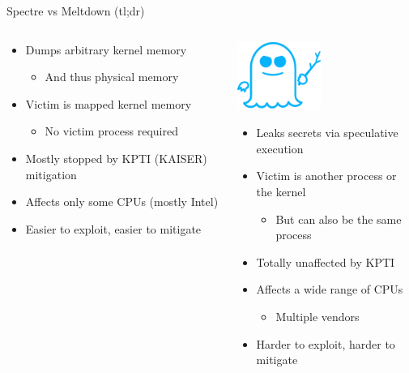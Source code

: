 \documentclass[10pt, dvipsnames, aspectratio=169]{beamer}
\begin{document}
\begingroup
\setwatermark{}
\begin{frame}[c]{Spectre vs Meltdown (tl;dr)}
  \begin{columns}
    \begin{column}[t]{0.5\textwidth}
      \centering
      
      \begin{itemize}
        \item Dumps arbitrary kernel memory
        \begin{itemize}
          \item And thus physical memory
        \end{itemize}
        \item Victim is mapped kernel memory
        \begin{itemize}
          \item No victim process required
        \end{itemize}
        \item Mostly stopped by KPTI (KAISER) mitigation
        \item Affects only some CPUs (mostly Intel)
        \item Easier to exploit, easier to mitigate
      \end{itemize}
    \end{column}

    \begin{column}[t]{0.5\textwidth}
      \centering
      \includegraphics[height=6em]{figs/logos/spectre.png}
      \begin{itemize}
        \item Leaks secrets via speculative execution
        \item Victim is another process or the kernel
        \begin{itemize}
          \item But can also be the same process
        \end{itemize}
        \item Totally unaffected by KPTI
        \item Affects a wide range of CPUs
        \begin{itemize}
          \item Multiple vendors
        \end{itemize}
        \item Harder to exploit, harder to mitigate
      \end{itemize}
    \end{column}
  \end{columns}
\end{frame}
\endgroup
\end{document}
